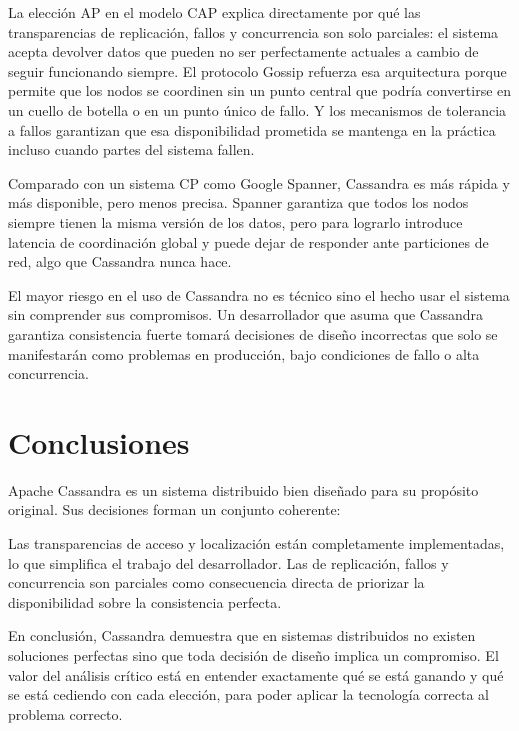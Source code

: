 \documentclass[12pt, a4paper]{article}
\begin{document}
La elección AP en el modelo CAP explica directamente por qué las
transparencias de replicación, fallos y concurrencia son solo parciales:
el sistema acepta devolver datos que pueden no ser perfectamente actuales
a cambio de seguir funcionando siempre. El protocolo Gossip refuerza
esa arquitectura porque permite que los nodos se coordinen sin un punto
central que podría convertirse en un cuello de botella o en un punto
único de fallo. Y los mecanismos de tolerancia a fallos garantizan que
esa disponibilidad prometida se mantenga en la práctica incluso cuando
partes del sistema fallen.

Comparado con un sistema CP como Google Spanner, Cassandra es más
rápida y más disponible, pero menos precisa. Spanner garantiza que
todos los nodos siempre tienen la misma versión de los datos, pero
para lograrlo introduce latencia de coordinación global y puede dejar
de responder ante particiones de red, algo que Cassandra nunca hace.

El mayor riesgo en el uso de Cassandra no es técnico sino el hecho
usar el sistema sin comprender sus compromisos. Un desarrollador que
asuma que Cassandra garantiza consistencia fuerte tomará decisiones
de diseño incorrectas que solo se manifestarán como problemas en
producción, bajo condiciones de fallo o alta concurrencia.

\section{Conclusiones}

Apache Cassandra es un sistema distribuido bien diseñado para su
propósito original. Sus decisiones forman un conjunto coherente:

Las transparencias de acceso y localización están completamente
implementadas, lo que simplifica el trabajo del desarrollador. Las
de replicación, fallos y concurrencia son parciales como consecuencia
directa de priorizar la disponibilidad sobre la consistencia perfecta.

En conclusión, Cassandra demuestra que en sistemas distribuidos no
existen soluciones perfectas sino que toda decisión de diseño implica un
compromiso. El valor del análisis crítico está en entender exactamente
qué se está ganando y qué se está cediendo con cada elección, para
poder aplicar la tecnología correcta al problema correcto.
\end{document}
